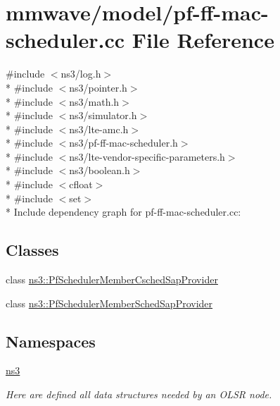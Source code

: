 \hypertarget{mmwave_2model_2pf-ff-mac-scheduler_8cc}{}\section{mmwave/model/pf-\/ff-\/mac-\/scheduler.cc File Reference}
\label{mmwave_2model_2pf-ff-mac-scheduler_8cc}
{\ttfamily \#include $<$ns3/log.\+h$>$}\\*
{\ttfamily \#include $<$ns3/pointer.\+h$>$}\\*
{\ttfamily \#include $<$ns3/math.\+h$>$}\\*
{\ttfamily \#include $<$ns3/simulator.\+h$>$}\\*
{\ttfamily \#include $<$ns3/lte-\/amc.\+h$>$}\\*
{\ttfamily \#include $<$ns3/pf-\/ff-\/mac-\/scheduler.\+h$>$}\\*
{\ttfamily \#include $<$ns3/lte-\/vendor-\/specific-\/parameters.\+h$>$}\\*
{\ttfamily \#include $<$ns3/boolean.\+h$>$}\\*
{\ttfamily \#include $<$cfloat$>$}\\*
{\ttfamily \#include $<$set$>$}\\*
Include dependency graph for pf-\/ff-\/mac-\/scheduler.cc\+:
\subsection*{Classes}
\begin{DoxyCompactItemize}
\item 
class \hyperlink{classns3_1_1PfSchedulerMemberCschedSapProvider}{ns3\+::\+Pf\+Scheduler\+Member\+Csched\+Sap\+Provider}
\item 
class \hyperlink{classns3_1_1PfSchedulerMemberSchedSapProvider}{ns3\+::\+Pf\+Scheduler\+Member\+Sched\+Sap\+Provider}
\end{DoxyCompactItemize}
\subsection*{Namespaces}
\begin{DoxyCompactItemize}
\item 
 \hyperlink{namespacens3}{ns3}
\begin{DoxyCompactList}\small\item\em Here are defined all data structures needed by an O\+L\+SR node. \end{DoxyCompactList}\end{DoxyCompactItemize}
